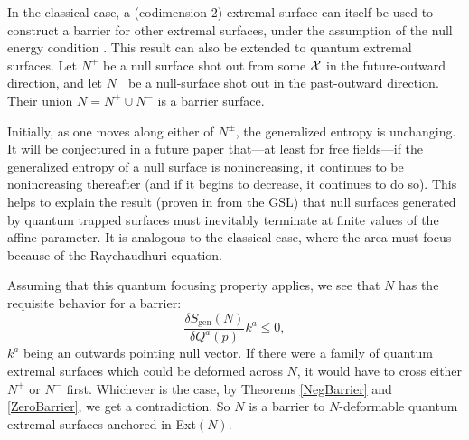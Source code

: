 \documentclass[12pt]{article}
\theoremstyle{remark}
\numberwithin{equation}{section}
\numberwithin{equation}{section}
\begin{document}


In the classical case, a (codimension 2) extremal surface can itself be used to construct a barrier for other extremal surfaces, under the assumption of the null energy condition \cite{EngelhardtWall}.  This result can also be extended to quantum extremal surfaces.  Let $N^+$ be a null surface shot out from some ${\cal X}$ in the future-outward direction, and let $N^-$ be a null-surface shot out in the past-outward direction.  Their union $N = N^+ \cup N^-$ is a barrier surface.

Initially, as one moves along either of $N^\pm$, the generalized entropy is unchanging.  It will be conjectured in a future paper \cite{EntropicFocusing} that---at least for free fields---if the generalized entropy of a null surface is nonincreasing, it continues to be nonincreasing thereafter (and if it begins to decrease, it continues to do so).  This helps to explain the result (proven in \cite{Wall12} from the GSL) that null surfaces generated by quantum trapped surfaces must inevitably terminate at finite values of the affine parameter.  It is analogous to the classical case, where the area must focus because of the Raychaudhuri equation.

Assuming that this quantum focusing property applies, we see that $N$ has the requisite behavior for a barrier:
\begin{equation} \frac{\delta S_{\text{gen}}(N)}{\delta Q^{a}(p)} k^a \leq 0,\end{equation}
$k^a$ being an outwards pointing null vector.  If there were a family of quantum extremal surfaces which could be deformed across $N$, it would have to cross either $N^+$ or $N^-$ first.  Whichever is the case, by Theorems \ref{NegBarrier} and \ref{ZeroBarrier}, we get a contradiction.  So $N$ is a barrier to $N$-deformable quantum extremal surfaces anchored in Ext$(N)$.


\end{document}
